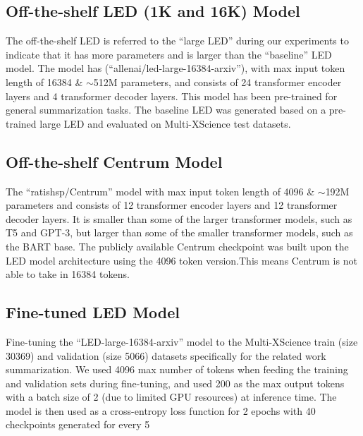 \documentclass[12pt, twocolumn]{article}
\numberwithin{equation}{section}
\begin{document}
\subsection{Off-the-shelf LED (1K and 16K) Model}
\label{app:model-large-led}

The off-the-shelf LED is referred to the ``large LED'' during our experiments to indicate that it has more parameters and is larger than the ``baseline'' LED model. The model has (``allenai/led-large-16384-arxiv''), with max input token length of 16384 \& $\sim$512M parameters, and consists of 24 transformer encoder layers and 4 transformer decoder layers. This model has been pre-trained for general summarization tasks. The baseline LED was generated based on a pre-trained large LED and evaluated on Multi-XScience test datasets.

\subsection{Off-the-shelf Centrum Model}
\label{app:model-centrum}

The ``ratishsp/Centrum'' model with max input token length of 4096 \& $\sim$192M parameters and consists of 12 transformer encoder layers and 12 transformer decoder layers. It is smaller than some of the larger transformer models, such as T5 and GPT-3, but larger than some of the smaller transformer models, such as the BART base. The publicly available Centrum checkpoint was built upon the LED model architecture using the 4096 token version.This means Centrum is not able to take in 16384 tokens.

\subsection{Fine-tuned LED Model}
\label{app:model-ft-led}

Fine-tuning the ``LED-large-16384-arxiv'' model to the Multi-XScience train (size 30369) and validation (size 5066) datasets specifically for the related work summarization. We used 4096 max number of tokens when feeding the training and validation sets during fine-tuning, and used 200 as the max output tokens with a batch size of 2 (due to limited GPU resources) at inference time. The model is then used as a cross-entropy loss function for 2 epochs with 40 checkpoints generated for every 5%
\end{document}
